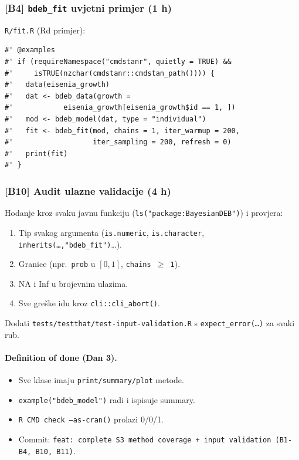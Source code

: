 \documentclass[11pt,a4paper]{article}
\newcommand{\file}[1]{\texttt{\small #1}}
\newcommand{\fn}[1]{\texttt{\small #1()}}
\newcommand{\code}[1]{\texttt{\small #1}}
\begin{document}
\subsubsection*{[B4] \texttt{bdeb\_fit} uvjetni primjer (1 h)}

\file{R/fit.R} (Rd primjer):

\begin{lstlisting}
#' @examples
#' if (requireNamespace("cmdstanr", quietly = TRUE) &&
#'     isTRUE(nzchar(cmdstanr::cmdstan_path()))) {
#'   data(eisenia_growth)
#'   dat <- bdeb_data(growth =
#'            eisenia_growth[eisenia_growth$id == 1, ])
#'   mod <- bdeb_model(dat, type = "individual")
#'   fit <- bdeb_fit(mod, chains = 1, iter_warmup = 200,
#'                   iter_sampling = 200, refresh = 0)
#'   print(fit)
#' }
\end{lstlisting}

\subsubsection*{[B10] Audit ulazne validacije (4 h)}

Hodanje kroz svaku javnu funkciju (\code{ls("package:BayesianDEB")})
i provjera:

\begin{enumerate}[leftmargin=1.4em,nosep]
  \item Tip svakog argumenta (\code{is.numeric}, \code{is.character},
    \code{inherits(\dots,"bdeb\_fit")}\dots).
  \item Granice (npr.\ \code{prob} u $[0,1]$, \code{chains $\ge$ 1}).
  \item NA i Inf u brojevnim ulazima.
  \item Sve greške idu kroz \code{cli::cli\_abort()}.
\end{enumerate}

\noindent Dodati \file{tests/testthat/test-input-validation.R} s
\code{expect\_error(\dots)} za svaki rub.

\paragraph{Definition of done (Dan 3).}
\begin{itemize}[leftmargin=1.4em,nosep]
  \item Sve klase imaju \code{print/summary/plot} metode.
  \item \code{example("bdeb\_model")} radi i ispisuje summary.
  \item \fn{R CMD check --as-cran} prolazi 0/0/1.
  \item Commit: \code{feat: complete S3 method coverage + input
    validation (B1-B4, B10, B11)}.
\end{itemize}
\end{document}
